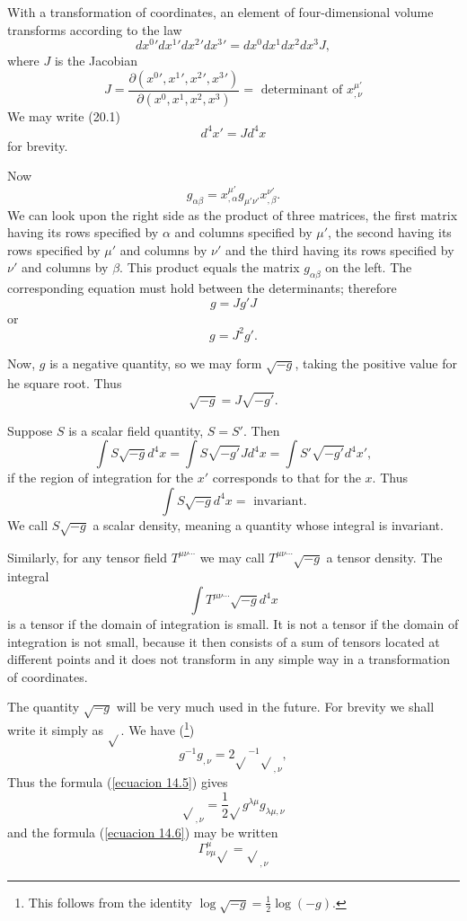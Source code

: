 With a transformation of coordinates, an element of four-dimensional volume transforms according to the law
\begin{equation}
 \label{ecuacion 20.1}
 {dx^0}'{dx^1}'{dx^2}'{dx^3}' = {dx^0}{dx^1}{dx^2}{dx^3} J,
\end{equation}
where $J$ is the Jacobian
\[
 J = \frac{\partial({x^0}',{x^1}',{x^2}',{x^3}')}{\partial({x^0},{x^1},{x^2},{x^3})}
 = \mbox{ determinant of } x^{\mu'}_{,\nu}
\]
We may write (20.1)
\[
 d^4 x' = J d^4 x
\]
for brevity.

Now
\[
   g_{\alpha\beta} = x^{\mu'}_{,\alpha} g_{\mu'\nu'} x^{\nu'}_{,\beta}.
\]
We can look upon the right side as the product of three matrices, the first matrix having its rows specified by 
$\alpha$ and columns specified by $\mu'$, the second having its rows specified by $\mu'$ and columns by $\nu'$ and the 
third having its rows specified by $\nu'$ and columns by $\beta$. This product equals the matrix $g_{\alpha\beta}$ on 
the left. The corresponding equation must hold between the determinants; therefore
\[
 g = J g' J
\]
or
\[
 g = J^2 g'.
\]

Now, $g$ is a negative quantity, so we may form $\sqrt{-g}$, taking the positive value for he square root. Thus
\begin{equation}
 \label{ecuacion 20.3}
 \sqrt{-g} = J \sqrt{- g'}.
\end{equation}

Suppose $S$ is a scalar field quantity, $S = S'$. Then
\[
\int{S \sqrt{-g} d^4 x} = \int{S \sqrt{-g'} J d^4 x} = \int{S' \sqrt{-g'} d^4 x'},
\]
if the region of integration for the $x'$ corresponds to that for the $x$. Thus
\begin{equation}
 \label{ecuacion 20.4}
 \int{S \sqrt{-g} d^4 x} = \mbox{ invariant.}
\end{equation}
We call $S \sqrt{-g}$ a scalar density, meaning a quantity whose integral is invariant.

Similarly, for any tensor field $T^{\mu\nu\cdots}$ we may call $T^{\mu\nu\cdots}\sqrt{-g}$ a tensor density. The 
integral
\[
   \int{T^{\mu\nu\cdots}\sqrt{-g} d^4 x}
\]
is a tensor if the domain of integration is small. It is not a tensor if the domain of integration is not small, 
because it then consists of a sum of tensors located at different points and it does not transform in any simple way in 
a transformation of coordinates.

The quantity $\sqrt{-g}$ will be very much used in the future. For brevity we shall write it simply as $\sqrt{}$. We 
have (\footnote{This follows from the identity $\log \sqrt{-g } = \frac{1}{2} \log (-g) $.})
\[
 g^{-1} g_{,\nu} = 2 {\sqrt{}}^{-1} {\sqrt{}}_{,\nu}, 
\]
Thus the formula (\ref{ecuacion 14.5}) gives 
\begin{equation}
 \label{ecuacion 20.5}
 \sqrt{}_{,\nu} = \frac{1}{2} \sqrt{} g^{\lambda\mu}g_{\lambda\mu,\nu}
\end{equation}
and the formula (\ref{ecuacion 14.6}) may be written
\begin{equation}
 \label{ecuacion 20.6}
 \Gamma^\mu_{\nu\mu}\sqrt{} = \sqrt{}_{,\nu}
\end{equation}

